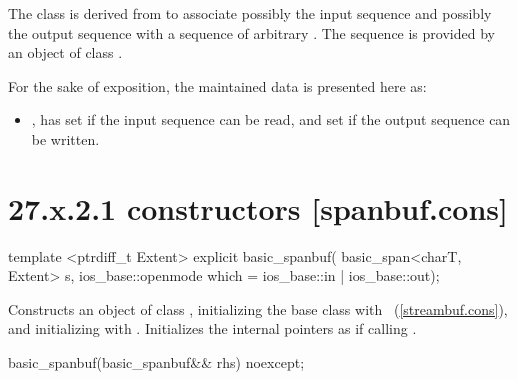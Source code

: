 \documentclass[ebook,11pt,article]{memoir}
\begin{document}
\pnum
The class
is derived from
to associate possibly the input sequence and possibly
the output sequence with a sequence of arbitrary
.
The sequence is provided by an object of class
.

\pnum
For the sake of exposition, the maintained data is presented here as:
\begin{itemize}
\item
{},
has
set if the input sequence can be read, and
set if the output sequence can be written.
\end{itemize}

\section{27.x.2.1  constructors [spanbuf.cons]}

%
\begin{itemdecl}
template <ptrdiff_t Extent>
explicit basic_spanbuf(
  basic_span<charT, Extent> s,
  ios_base::openmode which = ios_base::in | ios_base::out);
\end{itemdecl}

\begin{itemdescr}
\pnum
\effects
Constructs an object of class
,
initializing the base class with
~(\ref{streambuf.cons}), and initializing
with . 
Initializes the internal pointers as if calling .
\end{itemdescr}

%
\begin{itemdecl}
basic_spanbuf(basic_spanbuf&& rhs) noexcept;
\end{itemdecl}
\end{document}
